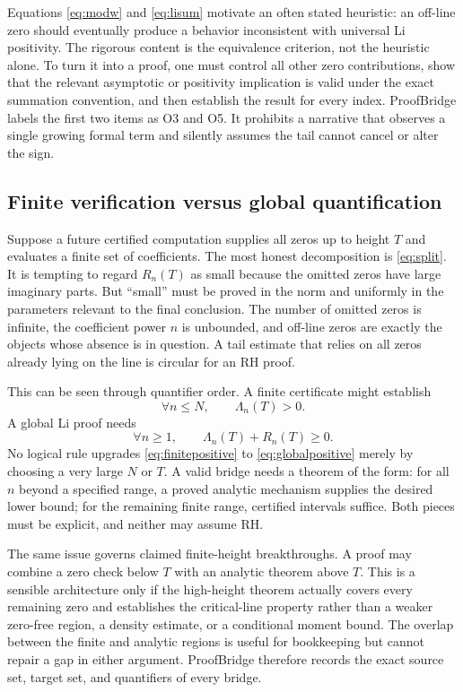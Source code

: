\documentclass[conference]{../../../../Conference-LaTeX-template_10-17-19/IEEEtran}
\begin{document}
Equations \eqref{eq:modw} and \eqref{eq:lisum} motivate an often stated heuristic: an off-line zero should eventually produce a behavior inconsistent with universal Li positivity. The rigorous content is the equivalence criterion, not the heuristic alone. To turn it into a proof, one must control all other zero contributions, show that the relevant asymptotic or positivity implication is valid under the exact summation convention, and then establish the result for every index. ProofBridge labels the first two items as O3 and O5. It prohibits a narrative that observes a single growing formal term and silently assumes the tail cannot cancel or alter the sign.

\subsection{Finite verification versus global quantification}
Suppose a future certified computation supplies all zeros up to height $T$ and evaluates a finite set of coefficients. The most honest decomposition is \eqref{eq:split}. It is tempting to regard $R_n(T)$ as small because the omitted zeros have large imaginary parts. But ``small'' must be proved in the norm and uniformly in the parameters relevant to the final conclusion. The number of omitted zeros is infinite, the coefficient power $n$ is unbounded, and off-line zeros are exactly the objects whose absence is in question. A tail estimate that relies on all zeros already lying on the line is circular for an RH proof.

This can be seen through quantifier order. A finite certificate might establish
\begin{equation}
 \forall n\le N,\qquad \Lambda_n(T)>0.
\label{eq:finitepositive}
\end{equation}
A global Li proof needs
\begin{equation}
 \forall n\ge1,\qquad \Lambda_n(T)+R_n(T)\ge0.
\label{eq:globalpositive}
\end{equation}
No logical rule upgrades \eqref{eq:finitepositive} to \eqref{eq:globalpositive} merely by choosing a very large $N$ or $T$. A valid bridge needs a theorem of the form: for all $n$ beyond a specified range, a proved analytic mechanism supplies the desired lower bound; for the remaining finite range, certified intervals suffice. Both pieces must be explicit, and neither may assume RH.

The same issue governs claimed finite-height breakthroughs. A proof may combine a zero check below $T$ with an analytic theorem above $T$. This is a sensible architecture only if the high-height theorem actually covers every remaining zero and establishes the critical-line property rather than a weaker zero-free region, a density estimate, or a conditional moment bound. The overlap between the finite and analytic regions is useful for bookkeeping but cannot repair a gap in either argument. ProofBridge therefore records the exact source set, target set, and quantifiers of every bridge.
\end{document}
